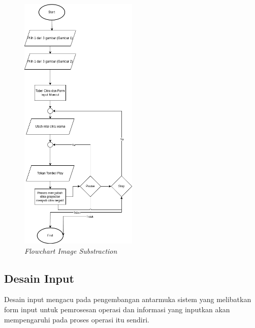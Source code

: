 \begin{enumerate}[leftmargin=1cm, itemindent=0.6cm,labelwidth=15pt, labelsep=5pt, listparindent=1cm,align=left]
      \begin{figure}[ht]
          \includegraphics[width=0.5\textwidth, center]{images/flowchart-substraction.png}
          \caption{\textit{Flowchart Image Substraction}}
      \end{figure}
\end{enumerate}

\subsection{Desain Input}

Desain input mengacu pada pengembangan antarmuka sistem yang melibatkan form input untuk pemrosesan operasi dan informasi yang inputkan akan mempengaruhi pada proses operasi itu sendiri.


